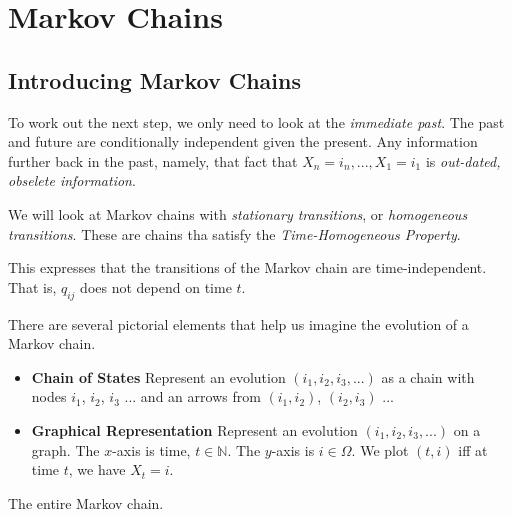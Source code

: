\chapter{Markov Chains}



\section{Introducing Markov Chains}






To work out the next step, we only need to look at the \textit{immediate past}. 
The past and future are conditionally independent given the present. 
Any information further back in the past, namely, 
that fact that $X_n = i_n, ..., X_1 = i_1$ is \textit{out-dated, obselete information}. 

We will look at Markov chains with \textit{stationary transitions}, or \textit{homogeneous transitions}. 
These are chains tha satisfy the \textit{Time-Homogeneous Property}. 


This expresses that the transitions of the Markov chain are time-independent. 
That is, $q_{ij}$ does not depend on time $t$. 

There are several pictorial elements that help us imagine the evolution of a Markov chain. 



\begin{itemize}
\item \textbf{Chain of States} Represent an evolution $(i_1, i_2, i_3, ...)$ 
as a chain with nodes $i_1$, $i_2$, $i_3$ ... and an arrows from $(i_1, i_2)$, 
$(i_2, i_3)$ ... 
\item \textbf{Graphical Representation} Represent an evolution $(i_1, i_2, i_3, ...)$ 
on a graph. The $x$-axis is time, $t \in \mathbb{N}$. The $y$-axis is $i \in \Omega$. 
We plot $(t,i)$ iff at time $t$, we have $X_t = i$. 
\end{itemize}

The entire Markov chain.

